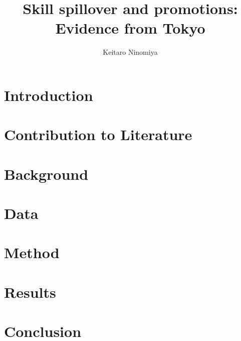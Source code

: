 \documentclass{article}
\title{Skill spillover and promotions: Evidence from Tokyo}
\author{Keitaro Ninomiya}
\begin{document}
\maketitle
\begin{itemize}


\section{Introduction}


\section{Contribution to Literature}


\section{Background}


\section{Data}


\section{Method}


\section{Results}


\section{Conclusion}


\end{itemize}
\printbibliography
\end{document}
